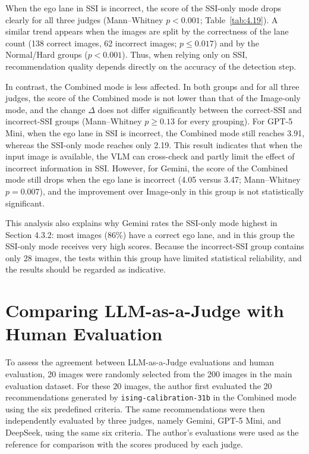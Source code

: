 \documentclass[12pt,a4paper]{report}
\begin{document}
When the ego lane in SSI is incorrect, the score of the SSI-only mode drops clearly for all three judges (Mann--Whitney $p<0.001$; Table~\ref{tab:4.19}). A similar trend appears when the images are split by the correctness of the lane count (138 correct images, 62 incorrect images; $p \le 0.017$) and by the Normal/Hard groups ($p<0.001$). Thus, when relying only on SSI, recommendation quality depends directly on the accuracy of the detection step.

In contrast, the Combined mode is less affected. In both groups and for all three judges, the score of the Combined mode is not lower than that of the Image-only mode, and the change $\Delta$ does not differ significantly between the correct-SSI and incorrect-SSI groups (Mann--Whitney $p \ge 0.13$ for every grouping). For GPT-5 Mini, when the ego lane in SSI is incorrect, the Combined mode still reaches 3.91, whereas the SSI-only mode reaches only 2.19. This result indicates that when the input image is available, the VLM can cross-check and partly limit the effect of incorrect information in SSI. However, for Gemini, the score of the Combined mode still drops when the ego lane is incorrect (4.05 versus 3.47; Mann--Whitney $p=0.007$), and the improvement over Image-only in this group is not statistically significant.

This analysis also explains why Gemini rates the SSI-only mode highest in Section 4.3.2: most images (86\%) have a correct ego lane, and in this group the SSI-only mode receives very high scores. Because the incorrect-SSI group contains only 28 images, the tests within this group have limited statistical reliability, and the results should be regarded as indicative.

\section{Comparing LLM-as-a-Judge with Human Evaluation}

To assess the agreement between LLM-as-a-Judge evaluations and human evaluation, 20 images were randomly selected from the 200 images in the main evaluation dataset. For these 20 images, the author first evaluated the 20 recommendations generated by \texttt{ising-calibration-31b} in the Combined mode using the six predefined criteria. The same recommendations were then independently evaluated by three judges, namely Gemini, GPT-5 Mini, and DeepSeek, using the same six criteria. The author's evaluations were used as the reference for comparison with the scores produced by each judge.
\end{document}
